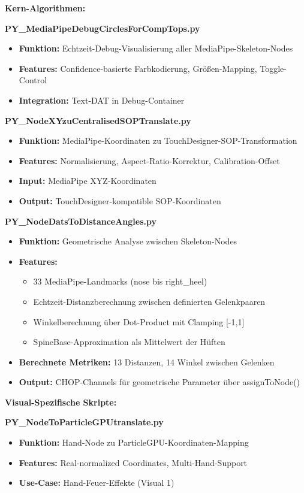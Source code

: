 \textbf{Kern-Algorithmen:}

\textbf{PY\_MediaPipeDebugCirclesForCompTops.py}
\begin{itemize}
    \item \textbf{Funktion:} Echtzeit-Debug-Visualisierung aller MediaPipe-Skeleton-Nodes
    \item \textbf{Features:} Confidence-basierte Farbkodierung, Größen-Mapping, Toggle-Control
    \item \textbf{Integration:} Text-DAT in Debug-Container
\end{itemize}

\textbf{PY\_NodeXYzuCentralisedSOPTranslate.py}
\begin{itemize}
    \item \textbf{Funktion:} MediaPipe-Koordinaten zu TouchDesigner-SOP-Transformation
    \item \textbf{Features:} Normalisierung, Aspect-Ratio-Korrektur, Calibration-Offset
    \item \textbf{Input:} MediaPipe XYZ-Koordinaten
    \item \textbf{Output:} TouchDesigner-kompatible SOP-Koordinaten
\end{itemize}

\textbf{PY\_NodeDatsToDistanceAngles.py}
\begin{itemize}
    \item \textbf{Funktion:} Geometrische Analyse zwischen Skeleton-Nodes
    \item \textbf{Features:} 
    \begin{itemize}
        \item 33 MediaPipe-Landmarks (nose bis right\_heel)
        \item Echtzeit-Distanzberechnung zwischen definierten Gelenkpaaren
        \item Winkelberechnung über Dot-Product mit Clamping [-1,1]
        \item SpineBase-Approximation als Mittelwert der Hüften
    \end{itemize}
    \item \textbf{Berechnete Metriken:} 13 Distanzen, 14 Winkel zwischen Gelenken
    \item \textbf{Output:} CHOP-Channels für geometrische Parameter über assignToNode()
\end{itemize}

\textbf{Visual-Spezifische Skripte:}

\textbf{PY\_NodeToParticleGPUtranslate.py}
\begin{itemize}
    \item \textbf{Funktion:} Hand-Node zu ParticleGPU-Koordinaten-Mapping
    \item \textbf{Features:} Real-normalized Coordinates, Multi-Hand-Support
    \item \textbf{Use-Case:} Hand-Feuer-Effekte (Visual 1)
\end{itemize}

